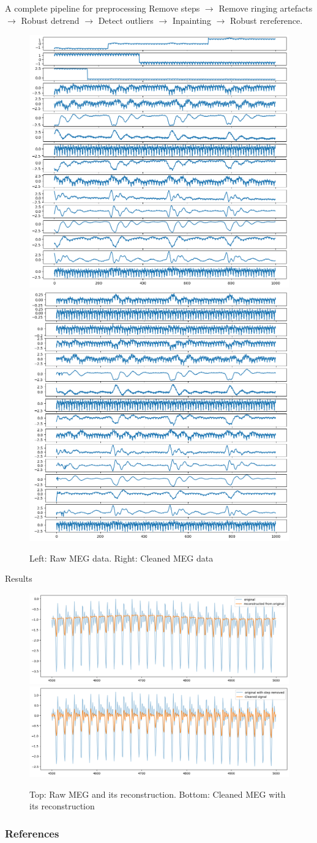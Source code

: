 \documentclass[10pt,serif]{beamer}
\begin{document}
\begin{frame}{A complete pipeline for preprocessing}
    Remove steps \(\to\) Remove ringing artefacts \(\to\) Robust detrend \(\to\) Detect outliers \(\to\) Inpainting \(\to\) Robust rereference.
    \begin{figure}
        \centering
        \includegraphics[width=.45\textwidth]{figures/data_raw.png}
        \includegraphics[width=.45\textwidth]{figures/data_clean.png}
        \caption{Left: Raw MEG data. Right: Cleaned MEG data}
        \label{fig:data}
    \end{figure}
\end{frame}

\begin{frame}{Results}
    \begin{figure}
        \centering
        \includegraphics[width=.77\textwidth]{figures/recons}\\
        \includegraphics[width=.77\textwidth]{figures/recons_clean}
        \caption{Top: Raw MEG and its reconstruction. Bottom: Cleaned MEG with its reconstruction}
        \label{fig:recons}
    \end{figure}
\end{frame}

\begin{frame}[allowframebreaks]
    \frametitle{References}
    \printbibliography
\end{frame}
\end{document}

